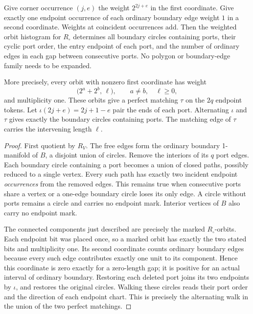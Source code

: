 \begin{theorem}
\label{thm:punctured-boundary-matching}
Give corner occurrence $(j,e)$ the weight $2^{2j+e}$ in the first coordinate.
Give exactly one endpoint occurrence of each ordinary boundary edge weight
$1$ in a second coordinate.  Weights at coincident occurrences add.  Then the
weighted orbit histogram for $R_\circ$ determines all boundary circles
containing ports, their cyclic port order, the entry endpoint of each port,
and the number of ordinary edges in each gap between consecutive ports.
No polygon or boundary-edge family needs to be expanded.

More precisely, every orbit with nonzero first coordinate has weight
\[
  \bigl(2^a+2^b,\,\ell\bigr),\qquad a\ne b,\quad\ell\geq0,
\]
and multiplicity one.  These orbits give a perfect matching $\tau$ on the
$2q$ endpoint tokens.  Let $\iota(2j+e)=2j+1-e$ pair the ends of each port.
Alternating $\iota$ and $\tau$ gives exactly the boundary circles containing
ports.  The matching edge of $\tau$ carries the intervening length $\ell$.
\end{theorem}

\begin{proof}
First quotient by $R_V$.  The free edges form the ordinary boundary
1-manifold of $B$, a disjoint union of circles.  Remove the interiors of its
$q$ port edges.  Each boundary circle containing a port becomes a union of
closed paths, possibly reduced to a single vertex.  Every such path has
exactly two incident endpoint \emph{occurrences} from the removed edges.
This remains true when consecutive ports share a vertex or a one-edge
boundary circle loses its only edge.  A circle without ports remains a
circle and carries no endpoint mark.  Interior vertices of $B$ also carry
no endpoint mark.

The connected components just described are precisely the marked
$R_\circ$-orbits.  Each endpoint bit was placed once, so a marked orbit has
exactly the two stated bits and multiplicity one.  Its second coordinate
counts ordinary boundary edges because every such edge contributes exactly
one unit to its component.  Hence this coordinate is zero exactly for a
zero-length gap; it is positive for an actual interval of ordinary boundary.
Restoring each deleted port joins its two endpoints by $\iota$, and restores
the original circles.  Walking these circles reads their port order and the
direction of each endpoint chart.  This is precisely the alternating walk
in the union of the two perfect matchings.
\end{proof}


